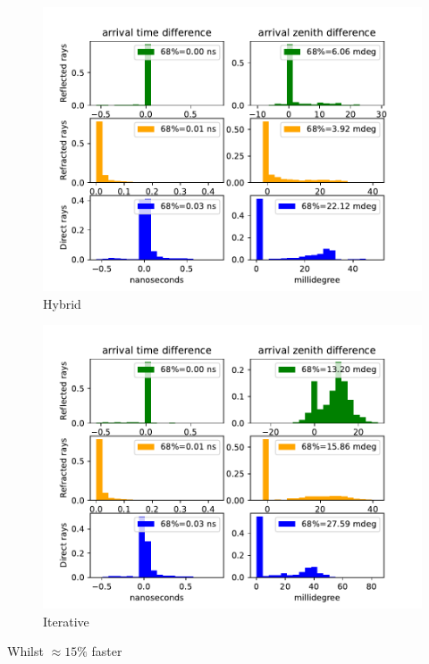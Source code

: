 \documentclass{beamer}
\begin{document}
\begin{frame}
	\begin{minipage}{0.49\textwidth}
	\begin{figure}
		\centering
		\includegraphics[width=\textwidth]{figures/hybrid_comparison_N_1000.pdf}
		\caption{Hybrid}
	\end{figure}
	\end{minipage}
	\begin{minipage}{0.49\textwidth}
	\begin{figure}
		\centering
		\includegraphics[width=\textwidth]{figures/iterative_comparison_N_1000.pdf}
		\caption{Iterative}
	\end{figure}
	\end{minipage}
Whilst $\approx 15\%$ faster
\end{frame}
\end{document}
